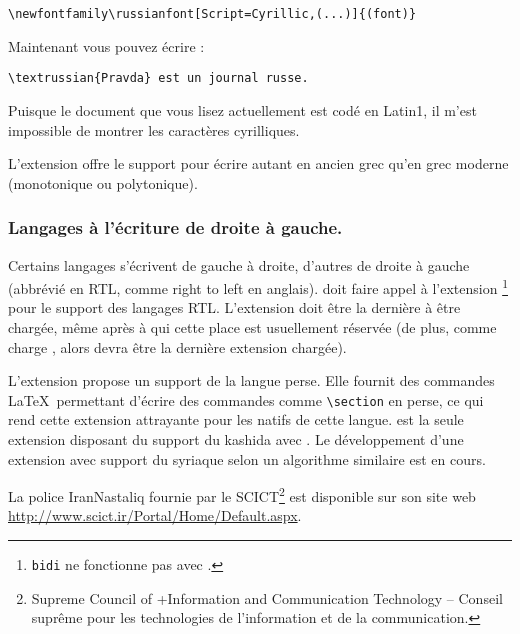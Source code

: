 \begin{lscommand}
\verb|\newfontfamily\russianfont[Script=Cyrillic,(...)]{(font)}|
\end{lscommand}

Maintenant vous pouvez écrire :

\begin{lscommand} \verb|\textrussian{Pravda} est un journal russe.|
\end{lscommand}
%
Puisque le document que vous lisez actuellement est codé en Latin1, il
m'est impossible de montrer les caractères
cyrilliques.

L'extension \cite{xgreek} offre le support
pour écrire autant en ancien grec qu'en grec moderne (monotonique ou
polytonique).

\subsubsection{Langages à l'écriture de droite à gauche.}

Certains langages s'écrivent de gauche à droite, d'autres de droite à
gauche (abbrévié en RTL, comme \og right to left \fg en
anglais).  doit faire appel à l'extension
\cite{bidi}\footnote{\texttt{bidi} ne fonctionne pas avec
  .} pour le support des langages RTL. L'extension
 doit être la dernière à être chargée, même après
 à qui cette place est usuellement réservée (de plus,
comme  charge , alors 
devra être la dernière extension chargée).

L'extension \cite{xepersian} propose un
support de la langue perse. Elle fournit des commandes \LaTeX\
permettant d'écrire des commandes comme \verb|\section| en perse,
ce qui rend cette extension attrayante pour les natifs de cette
langue.  est la seule extension disposant du support du
kashida\index{kashida} avec \hologo{XeLaTeX}. Le développement d'une
extension avec support du syriaque selon un algorithme similaire est
en cours.

La police IranNastaliq fournie par le SCICT\footnote{Supreme Council of
+Information and Communication Technology -- Conseil suprême pour les
technologies de l'information et de la communication. \NdT} est
disponible sur son site web
\url{http://www.scict.ir/Portal/Home/Default.aspx}.

